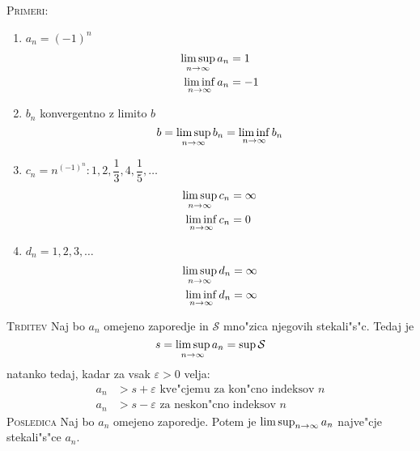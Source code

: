 \textsc{Primeri:}
\begin{enumerate}[1)]
	\item $a_n = (-1)^n$
	\begin{align*}
	\limsup_{n \rightarrow \infty} a_n &= 1 \\
	\liminf_{n \rightarrow \infty} a_n &= -1 \\
	\end{align*}
	
	\item $b_n$ konvergentno z limito $b$
	\begin{equation*}
	b = \limsup_{n \rightarrow \infty} b_n = \liminf_{n \rightarrow \infty} b_n
	\end{equation*}
	
	\item $c_n = n^{(-1)^n}: 1, 2, \dfrac{1}{3}, 4, \dfrac{1}{5}, \ldots$
	\begin{align*}
	\limsup_{n \rightarrow \infty} c_n &= \infty \\
	\liminf_{n \rightarrow \infty} c_n &= 0
	\end{align*}
	
	\item $d_n = 1, 2, 3, \ldots$
	\begin{align*}
	\limsup_{n \rightarrow \infty} d_n &= \infty \\
	\liminf_{n \rightarrow \infty} d_n &=\infty
	\end{align*}
\end{enumerate}

\textsc{Trditev} Naj bo $a_n$ omejeno zaporedje in $\mathcal{S}$ mno"zica njegovih stekali"s"c. Tedaj je
\begin{equation*}
s = \limsup_{n \rightarrow \infty} a_n = \sup \mathcal{S}
\end{equation*}
natanko tedaj, kadar za vsak $\varepsilon > 0$ velja:
\begin{align*}
a_n &> s + \varepsilon \text{ kve"cjemu za kon"cno indeksov $n$} \\
a_n &> s-\varepsilon \text{ za neskon"cno indeksov $n$}
\end{align*}
\textsc{Posledica} Naj bo $a_n$ omejeno zaporedje. Potem je $\limsup_{n \rightarrow \infty} a_n$ najve"cje stekali"s"ce $a_n$.

